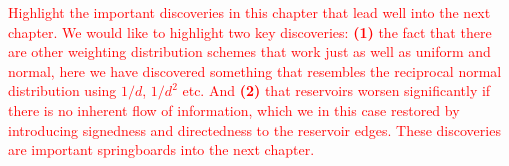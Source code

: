\textcolor{red}{
  Highlight the important discoveries in this chapter that lead well into the
next chapter. We would like to highlight two key discoveries: \textbf{(1)} the
fact that there are other weighting distribution schemes that work just as well
as uniform and normal, here we have discovered something that resembles the
reciprocal normal distribution using $1/d$, $1/d^2$ etc. And \textbf{(2)} that
reservoirs worsen significantly if there is no inherent flow of information,
which we in this case restored by introducing signedness and directedness to the
reservoir edges. These discoveries are important springboards into the next
chapter.
}


